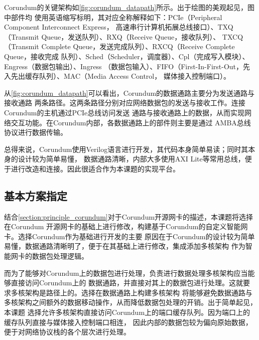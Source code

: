 Corundum的关键架构如\autoref{fig:corundum_datapath}所示。出于绘图的美观起见，图中部件均
使用英语缩写标明，其对应全称解释如下：PCIe（Peripheral Component Interconnect Express，
高速串行计算机拓展总线接口）、TXQ（Transmit Queue，发送队列）、RXQ（Receive Queue，接收队列）、
TXCQ（Transmit Complete Queue，发送完成队列）、RXCQ（Receive Complete Queue，接收完成
队列）、Sched（Scheduler，调度器）、Cpl（完成写入模块）、Engress（数据包输出）、Ingress
（数据包输入）、FIFO（First-In-First-Out，先入先出缓存队列）、MAC（Media Access Control，
媒体接入控制端口）。


从\autoref{fig:corundum_datapath}可以看出，Corundum的数据通路主要分为发送通路与接收通路
两条路径。这两条路径分别对应网络数据包的发送与接收工作。连接Corundum的主机通过PCIe总线访问发送
通路与接收通路上的数据，从而实现网络交互功能。在Corundum内部，各数据通路上的部件则主要是通过
AMBA总线协议\cite{arm2011axi}进行数据传输。

总得来说，Corundum使用Verilog语言进行开发，其代码本身简单易读；同时其本身的设计较为简单易懂，
数据通路清晰，内部大多使用AXI Lite等常用总线，便于进行改造和连接。因此很适合作为本课题的实现平台。

\subsection{基本方案指定}
\label{section:principle_basicpath}



结合\autoref{section:principle_corundum}对于Corundum开源网卡的描述，本课题将选择在Corundum
开源网卡的基础上进行修改，构建基于Corundum的自定义智能网卡。选择Corundum作为基础进行开发的主要
原因在于Corundum的设计较为简单易懂，数据通路清晰明了，便于在其基础上进行修改，集成添加多核架构
作为智能网卡的数据包处理逻辑。

而为了能够对Corundum上的数据包进行处理，负责进行数据处理多核架构应当能够直接访问Corundum上的
数据通路，并直接对其上的数据包进行处理。这就要求多核架构是路径上的。选择在数据通路上构建多核架构
将能够避免数据通路与多核架构之间额外的数据移动操作，从而降低数据包处理的开销。出于简单起见，本课题
选择允许多核架构直接访问Corundum上的端口缓存队列。因为端口上的缓存队列直接与媒体接入控制端口相连，
因此内部的数据包较为偏向原始数据，便于对网络协议栈的各个层次进行处理。

